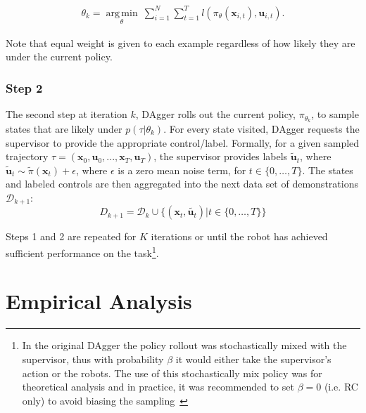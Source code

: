 \documentclass[10pt, conference]{ieeeconf}      %
\DeclareMathOperator*{\argmin}{arg\,min}
\newcommand{\bu}{\mathbf{u}}
\newcommand{\bx}{\mathbf{x}}
\begin{document}
 \vspace{-1ex}
\begin{align}\label{eq:super_objj}
\theta_{k} = \underset{\theta}{\argmin} \: \sum_{i=1}^{N} \sum_{t=1}^T  l(\pi_{\theta}(\bx_{i,t}),\bu_{i,t}).
\end{align}

\noindent Note that equal weight is given to each example regardless of how likely they are under the current policy.
 

 \subsubsection{Step 2}
The second step at iteration $k$, DAgger rolls out the current policy, $\pi_{\theta_{k}}$, to sample states that are likely under $p(\tau|\theta_{k})$.  For every state visited, DAgger requests the supervisor to provide the appropriate control/label. Formally, for a given sampled trajectory  $\tau = (\bx_0,\bu_0,...,\bx_T,\bu_T )$, the supervisor provides labels $\tilde{\bu}_t$, where $\tilde{\bu}_t \sim \tilde{\pi}(\bx_t) + \epsilon$, where $\epsilon$ is a  zero mean noise term, for $t\in \{0, \ldots, T\}$.
The states and labeled controls are then aggregated into the next data set of demonstrations $\mathcal{D}_{k+1}$:
$$D_{k+1}=\mathcal{D}_k \cup \{(\bx_t,\tilde{\bu_t})|t\in\{0,\ldots,T\}\} $$

\noindent Steps 1 and 2 are repeated for $K$ iterations or until the robot has achieved sufficient performance on the
task\footnote{In the original DAgger the policy rollout was stochastically mixed with the supervisor, thus with
    probability $\beta$ it would either take the supervisor's action or the robots. The use of this stochastically mix
    policy was for theoretical analysis and in practice, it was recommended to set $\beta = 0$ (i.e. RC only) to avoid biasing the
sampling~\cite{NIPS2014_5421,ross2010reduction}}.


 


\section{Empirical Analysis}
\end{document}
